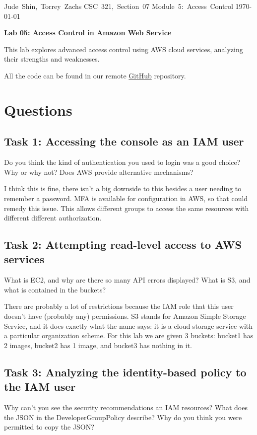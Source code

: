 \documentclass[11pt]{article}
\begin{document}
\hfill\vbox{\hbox{Jude Shin, Torrey Zachs}
		\hbox{CSC 321, Section 07}	
		\hbox{Module 5: Access Control}	
		\hbox{\today}}\par

\bigskip
\centerline{\Large\bf Lab 05: Access Control in Amazon Web Service}\par
\bigskip

This lab explores advanced access control using AWS cloud services, analyzing their strengths and weaknesses. 

All the code can be found in our remote \href{https://github.com/jude-shin/CSC\_321}{GitHub} repository.


\section*{Questions}
\subsection*{Task 1: Accessing the console as an IAM user}
Do you think the kind of authentication you used to login was a good choice? Why or why not? Does AWS provide alternative mechanisms?

I think this is fine, there isn't a big downside to this besides a user needing to remember a password. MFA is available for configuration in AWS, so that could remedy this issue. This allows different groups to access the same resources with different different authorization.

\subsection*{Task 2: Attempting read-level access to AWS services}
What is EC2, and why are there so many API errors displayed? What is S3, and what is contained in the buckets?

There are probably a lot of restrictions because the IAM role that this user doesn't have (probably any) permissions. S3 stands for Amazon Simple Storage Service, and it does exactly what the name says: it is a cloud storage service with a particular organization scheme. For this lab we are given 3 buckets: bucket1 has 2 images, bucket2 has 1 image, and bucket3 has nothing in it. 


\subsection*{Task 3: Analyzing the identity-based policy to the IAM user}
Why can't you see the security recommendations an IAM resources? What does the JSON in the DeveloperGroupPolicy describe? Why do you think you were permitted to copy the JSON?
\end{document}
